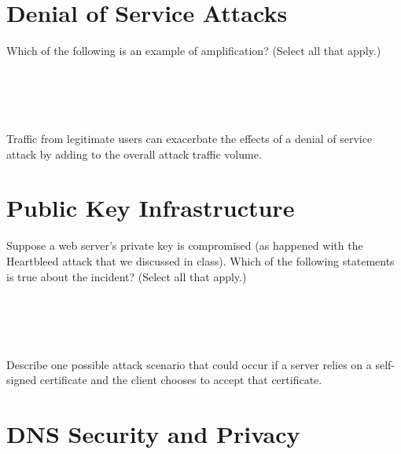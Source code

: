 \section*{Denial of Service Attacks}

  Which of the following is an example of amplification? (Select all
that apply.)\\
 \\
 \\
 \\
 \\
\eprob

  Traffic from legitimate users can exacerbate the effects of a denial of
service attack by adding to the overall attack traffic volume. \\
\yesnoyes
\eprob


\pagebreak
\section*{Public Key Infrastructure}

Suppose a web server's private key is compromised (as happened with the
Heartbleed attack that we discussed in class). Which of the following
statements is true about the incident? (Select all that apply.)\\
\\
\\
\\
\\
\eprob

  Describe one possible attack scenario that could occur if a server relies on a
self-signed certificate and the client chooses to accept that certificate.\\
\eprob

\section*{DNS Security and Privacy}

